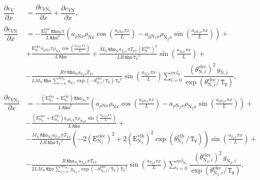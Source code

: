 \documentclass[10pt]{article}
\newcommand{\diff}[2] {\dfrac{\partial #1 }{\partial #2}}
\newcommand{\Rho}{\,\mathtt{Rho}}
\newcommand{\TV}{\,\mathtt{T_V}}
\newcommand{\N}{\text{N}}
\newcommand{\elec}{\text{elec}}
\newcommand{\vib}{\text{vib}}
\newcommand{\E}{\text{E}}
\newcommand{\DeVDx}{\diff{e_V}{x}}
\newcommand{\DeVNDx}{\diff{e_{V \N}}{x}}
\newcommand{\DeVNNDx}{\diff{e_{V \N_2}}{x}}
\newcommand{\eelecNden}{\,\sum_{i=0}^{nel_{\N}}   \, g_{\N,i}   \exp \left( -\theta^{\elec}_{\N,i} / \TV  \right) }
\newcommand{\eelecNdoisden}{\,\sum_{i=0}^{nel_{\N_2}}  \, g_{\N_2,i}   \exp \left( -\theta^{\elec}_{\N_2,i} /  \TV \right)}
\begin{document}
\begin{equation}
\begin{split}\label{eq:DeVDx}
 \DeVDx &= \DeVNNDx + \DeVNDx,\\
%
&\\ %
%
 \DeVNDx &= - \frac{\E^{\elec}_{\N} \Rho_{\N} \pi }{L \Rho^{2}}\left(a_{ \rho \N x} \rho_{\N x} \cos\left(\frac{a_{ \rho \N x} \pi x}{L}\right) - a_{ \rho \N_2 x} \rho_{\N_2 x} \sin\left(\frac{a_{ \rho \N_2 x} \pi x}{L}\right)\right) +\\
%
&+ \frac{\E^{\elec}_{\N} a_{ \rho \N x} \pi \rho_{\N x} \cos\left(\frac{a_{ \rho \N x} \pi x}{L}\right)}{L \Rho} + \frac{M_{\N}
\Rho_{\N} a_{T_V x} \pi T_{Vx} \left( \E^{\elec}_{\N} \right)^2 }{L R \Rho \TV^{2}}\sin\left(\frac{a_{T_V x} \pi x}{L}\right) +\\
%
&- \frac{R \pi \Rho_{\N}  a_{T_V x} T_{Vx} }{L M_{\N} \Rho \eelecNden \TV^{2}}\sin\left(\frac{a_{T_V x} \pi
x}{L}\right)\sum_{i=0}^{nel_{\N}} \dfrac{ \left( \theta^{\elec}_{\N,i} \right)^2   \, g_{\N,i} }{ \exp \left(
\theta^{\elec}_{\N,i} / \TV \right)},\\
%
&\\ %
%
 \DeVNNDx &= - \frac{\left(\E^{\elec}_{\N_2} + \E^{\vib}_{\N_2} \right) \Rho_{\N_2} \pi }{L \Rho^{2}}\left(a_{ \rho \N x} \rho_{\N
x} \cos\left(\frac{a_{ \rho \N x} \pi x}{L}\right) - a_{ \rho \N_2 x} \rho_{\N_2 x} \sin\left(\frac{a_{ \rho \N_2 x} \pi
x}{L}\right)\right) +\\
%
&- \frac{\left( \E^{\elec}_{\N_2} + \E^{\vib}_{\N_2} \right)a_{ \rho \N_2 x} \pi \rho_{\N_2 x}  \sin\left(\frac{a_{ \rho \N_2 x}
\pi x}{L}\right)}{L \Rho} +\\
%
&- \frac{M_{\N} \Rho_{\N_2} a_{T_V x} \pi T_{Vx} }{L R \Rho \TV^{2}}\left(- 2 \left( \E^{\elec}_{\N_2} \right)^2 + 2 \left(
\E^{\vib}_{\N_2} \right)^2 \exp\left( \theta^{\vib}_{\N_2} \, / \TV \right) \right) \sin\left(\frac{a_{T_V x} \pi x}{L}\right) +\\
%
&- \frac{R \Rho_{\N_2} a_{T_V x}  \pi T_{Vx} }{2 L M_{\N} \Rho \eelecNdoisden \TV^{2}}\sin\left(\frac{a_{T_V x} \pi x}{L}\right)
\sum_{i=0}^{nel_{\N_2}} \dfrac{ \left( \theta^{\elec}_{\N_2,i} \right)^2   \, g_{\N_2,i} }{ \exp \left( \theta^{\elec}_{\N_2,i} / 
\TV \right)},
%
 \end{split}
\end{equation}
\end{document}
